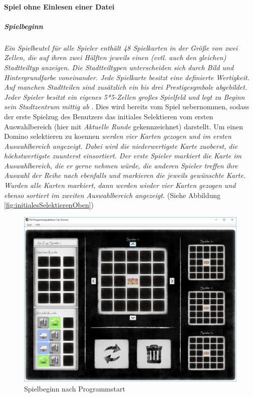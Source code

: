 \paragraph{Spiel ohne Einlesen einer Datei}
\subparagraph{Spielbeginn}
\emph{Ein Spielbeutel für alle Spieler enthält 48 Spielkarten in der Größe von zwei Zellen, die auf ihren zwei Hälften jeweils einen (evtl. auch den gleichen) Stadtteiltyp anzeigen. Die Stadtteiltypen unterscheiden sich durch Bild und Hintergrundfarbe voneinander. Jede Spielkarte besitzt eine definierte Wertigkeit. Auf manchen Stadtteilen sind zusätzlich ein bis drei Prestigesymbole abgebildet. Jeder Spieler besitzt ein eigenes 5*5-Zellen großes Spielfeld und legt zu Beginn sein Stadtzentrum mittig ab}
\cite{aufgabenstellung}. 
Dies wird bereits vom Spiel uebernommen, sodass der erste Spielzug des Benutzers das initiales Selektieren vom ersten Auswahlbereich (hier mit \emph{Aktuelle Runde} gekennzeichnet) darstellt. Um einen Domino selektieren zu koennen \emph{ werden vier Karten gezogen und im ersten Auswahlbereich angezeigt. Dabei wird die niederwertigste Karte zuoberst, die höchstwertigste zuunterst einsortiert. Der erste Spieler markiert die Karte im Auswahlbereich, die er gerne nehmen würde, die anderen Spieler treffen ihre Auswahl der Reihe nach ebenfalls und markieren die jeweils gewünschte Karte. Wurden alle Karten markiert, dann werden wieder vier Karten gezogen und ebenso sortiert im zweiten Auswahlbereich angezeigt.} 
\cite{aufgabenstellung}
(Siehe Abbildung \ref{fig:initialesSelektierenOben})

\begin{figure}
	\centering
	\includegraphics{screenshots/screenshot_Spielbeginn.png}
	\caption[Spielbeginn]{Spielbeginn nach Programmstart}
	\label{fig:spielbeginnGui}
\end{figure}


